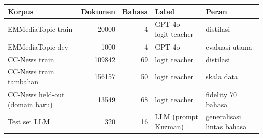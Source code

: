 \begin{tabular}{lrrll}
\toprule
Korpus & Dokumen & Bahasa & Label & Peran \\
\midrule
EMMediaTopic train & 20000 & 4 & GPT-4o + logit teacher & distilasi \\
EMMediaTopic dev & 1000 & 4 & GPT-4o & evaluasi utama \\
CC-News train & 109842 & 69 & logit teacher & distilasi \\
CC-News train tambahan & 156157 & 50 & logit teacher & skala data \\
CC-News held-out (domain baru) & 13549 & 68 & logit teacher & fidelity 70 bahasa \\
Test set LLM & 320 & 16 & LLM (prompt Kuzman) & generalisasi lintas bahasa \\
\bottomrule
\end{tabular}
